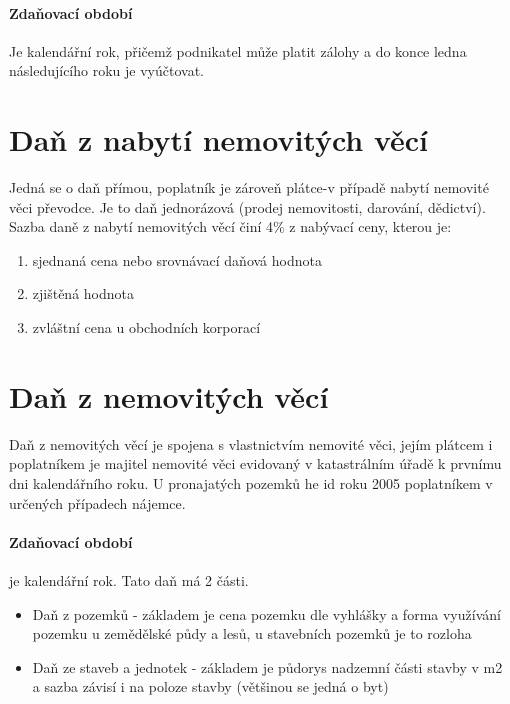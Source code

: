 \paragraph{Zdaňovací období}
Je kalendářní rok, přičemž podnikatel může platit zálohy a do konce ledna následujícího roku je vyúčtovat.

\section*{Daň z nabytí nemovitých věcí}

Jedná se o daň přímou, poplatník je zároveň plátce-v případě nabytí nemovité věci převodce. Je to daň jednorázová (prodej nemovitosti, darování, dědictví). Sazba daně z nabytí nemovitých věcí činí 4\% z nabývací ceny, kterou je:
\begin{enumerate}
    \item sjednaná cena nebo srovnávací daňová hodnota
    \item zjištěná hodnota
    \item zvláštní cena u obchodních korporací
\end{enumerate}

\section*{Daň z nemovitých věcí}

Daň z nemovitých věcí je spojena s vlastnictvím nemovité věci, jejím plátcem i poplatníkem je majitel nemovité věci evidovaný v katastrálním úřadě k prvnímu dni kalendářního roku. U pronajatých pozemků he id roku 2005 poplatníkem v určených případech nájemce.

\paragraph{Zdaňovací období} je kalendářní rok.
Tato daň má 2 části.
\begin{itemize}
    \item Daň z pozemků - základem je cena pozemku dle vyhlášky a forma využívání pozemku u zemědělské půdy a lesů, u stavebních pozemků je to rozloha
    \item Daň ze staveb a jednotek - základem je půdorys nadzemní části stavby v m2 a sazba závisí i na poloze stavby (většinou se jedná o byt)
\end{itemize}
